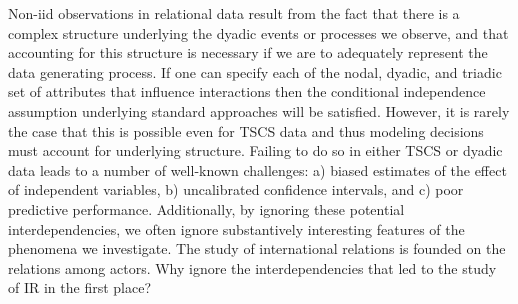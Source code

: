 
Non-iid observations in relational data result from the fact that there is a complex structure underlying the dyadic events or processes we observe, and that accounting for this structure is necessary if we are to adequately represent the data generating process. If one can specify each of the nodal, dyadic, and triadic set of attributes that influence interactions then the conditional independence assumption underlying standard approaches will be satisfied. However, it is rarely the case that this is possible even for TSCS data and thus modeling decisions must account for underlying structure. Failing to do so in either TSCS or dyadic data leads to a number of well-known challenges: a) biased estimates of the effect of independent variables, b) uncalibrated confidence intervals, and c) poor predictive performance. Additionally, by ignoring these potential interdependencies, we often ignore substantively interesting features of the phenomena we investigate. The study of international relations is founded on the relations among actors. Why ignore the interdependencies that led to the study of IR in the first place?